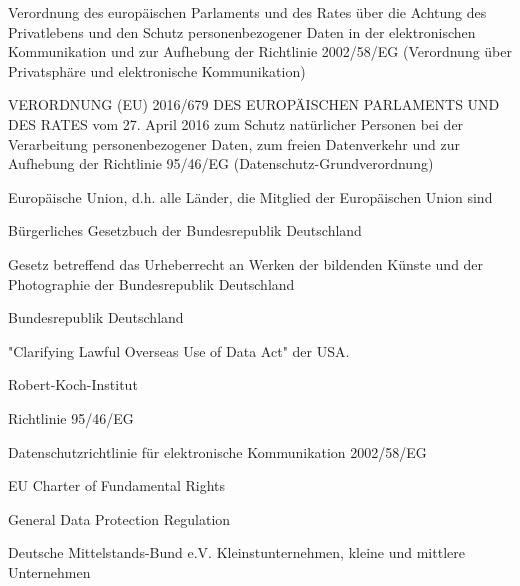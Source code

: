 {
    Verordnung des europäischen Parlaments und des Rates über die Achtung des
Privatlebens und den Schutz personenbezogener Daten in der elektronischen
Kommunikation und zur Aufhebung der Richtlinie 2002/58/EG (Verordnung über
Privatsphäre und elektronische Kommunikation)
}

{
    VERORDNUNG (EU) 2016/679 DES EUROPÄISCHEN PARLAMENTS UND DES RATES vom 27. April 2016 zum Schutz natürlicher Personen bei der Verarbeitung personenbezogener Daten, zum freien Datenverkehr und zur Aufhebung der Richtlinie 95/46/EG (Datenschutz-Grundverordnung)
}

{  
    Europäische Union, d.h. alle Länder, die Mitglied der Europäischen Union sind
}

{
    Bürgerliches Gesetzbuch der Bundesrepublik Deutschland
}

{
    Gesetz betreffend das Urheberrecht an Werken der bildenden Künste und der Photographie der Bundesrepublik Deutschland
}

{
    Bundesrepublik Deutschland
}

{
    "Clarifying Lawful Overseas Use of Data Act" der USA.
}

{
    Robert-Koch-Institut
}

{
    Richtlinie 95/46/EG
}

{
    Datenschutzrichtlinie für elektronische Kommunikation 2002/58/EG
}

{
    EU Charter of Fundamental Rights
}

{
    General Data Protection Regulation
}

{
    Deutsche Mittelstands-Bund e.V.
}
{
    Kleinstunternehmen, kleine und mittlere Unternehmen
}

\pagebreak
